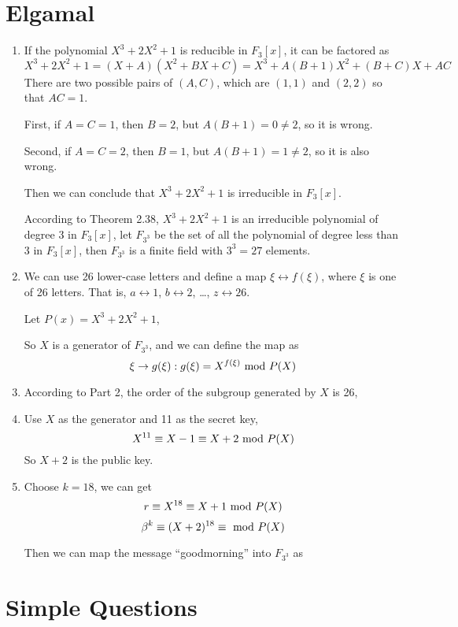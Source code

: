 \documentclass{article}
\renewcommand{\mod}{{\rm\ mod\ }}
\begin{document}
\section{Elgamal}
\begin{enumerate}
\item
If the polynomial $X^3+2X^2+1$ is reducible in $F_3[x]$, it can be factored as $$X^3+2X^2+1=(X+A)(X^2+BX+C)=X^3+A(B+1)X^2+(B+C)X+AC$$
There are two possible pairs of $(A,C)$, which are $(1,1)$ and $(2,2)$ so that $AC=1$.

First, if $A=C=1$, then $B=2$, but $A(B+1)=0\neq 2$, so it is wrong.

Second, if $A=C=2$, then $B=1$, but $A(B+1)=1\neq2$, so it is also wrong.

Then we can conclude that $X^3+2X^2+1$ is irreducible in $F_3[x]$.

According to Theorem 2.38, $X^3+2X^2+1$ is an irreducible polynomial of degree 3 in $F_3[x]$, let $F_{3^3}$ be the set of all the polynomial of degree less than 3 in $F_3[x]$, then $F_{3^3}$ is a finite field with $3^3=27$ elements.

\item

We can use 26 lower-case letters and define a map $\xi \leftrightarrow f(\xi)$, where $\xi$ is one of 26 letters. That is, $a \leftrightarrow 1$, $b \leftrightarrow 2$, \dots, $z \leftrightarrow 26$.

Let $P(x)=X^3+2X^2+1$,


So $X$ is a generator of $F_{3^3}$, and we can define the map as $$\xi \to g(\xi): g(\xi)=X^{f(\xi)} \mod P(X)$$ 

\item

According to Part 2, the order of the subgroup generated by $X$ is 26, 

\item
Use $X$ as the generator and 11 as the secret key,
$$X^{11}\equiv X-1 \equiv X+2 \mod P(X)$$
So $X+2$ is the public key.

\item
Choose $k=18$, we can get 
$$r \equiv X^{18} \equiv X+1 \mod P(X)$$
$$\beta^k \equiv (X+2)^{18} \equiv \mod P(X) $$

Then we can map the message ``goodmorning'' into $F_{3^3}$ as
$$$$



\end{enumerate}

\section{Simple Questions}
\end{document}
